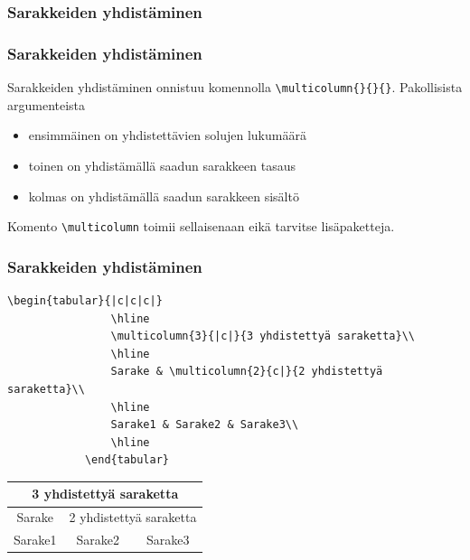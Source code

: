 \documentclass[handout,hyperref={colorlinks=true}]{beamer}
\theoremstyle{remark}
\begin{document}
\subsubsection{Sarakkeiden yhdistäminen}
\begin{frame}[fragile]
    \frametitle{Sarakkeiden yhdistäminen}
    Sarakkeiden yhdistäminen onnistuu komennolla \verb-\multicolumn{}{}{}-. Pakollisista argumenteista
    \begin{itemize}
        \item ensimmäinen on yhdistettävien solujen lukumäärä
        \item toinen on yhdistämällä saadun sarakkeen tasaus
        \item kolmas on yhdistämällä saadun sarakkeen sisältö
    \end{itemize}
    Komento \verb-\multicolumn- toimii sellaisenaan eikä tarvitse lisäpaketteja.
\end{frame}
\begin{frame}[fragile]
    \frametitle{Sarakkeiden yhdistäminen}
    \begin{scriptsize}
        \begin{Verbatim}[frame=single]
            \begin{tabular}{|c|c|c|}
                \hline
                \multicolumn{3}{|c|}{3 yhdistettyä saraketta}\\
                \hline
                Sarake & \multicolumn{2}{c|}{2 yhdistettyä saraketta}\\
                \hline
                Sarake1 & Sarake2 & Sarake3\\
                \hline
            \end{tabular}
        \end{Verbatim}
    \end{scriptsize}
    \begin{minipage}{5cm}
        \begin{scriptsize}
            \begin{tabular}{|c|c|c|}
                \hline
                \multicolumn{3}{|c|}{3 yhdistettyä saraketta}\\
                \hline
                Sarake & \multicolumn{2}{c|}{2 yhdistettyä saraketta}\\
                \hline
                Sarake1 & Sarake2 & Sarake3\\
                \hline
            \end{tabular}
        \end{scriptsize}
    \end{minipage}
\end{frame}
\end{document}
